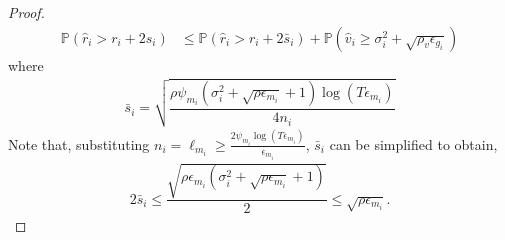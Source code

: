 \begin{proof}
\noindent
\begin{align}
\mathbb{P}(\hat{r}_{i}> r_{i} + 2s_{i})
&\leq \mathbb{P}\left( \hat{r}_{i} > r_{i}+ 2\bar{s}_i\right)  %
+ \mathbb{P}\left( \hat{v}_{i}\geq \sigma_{i}^{2}+\sqrt{\rho_{v}\epsilon_{g_{i}}}\right)\label{eq:prob_eq2}
\end{align}
where 
\begin{align*}
\bar{s}_i=\sqrt{\dfrac{\rho\psi_{m_i} (\sigma_{i}^{2}+\sqrt{\rho\epsilon_{m_{i}}} + 1)\log( T\epsilon_{m_{i}})}{4n_{i}}}
\end{align*}
Note that, substituting $n_i=\ell_{m_i}\ge \frac{2\psi_{m_i}\log{(T\epsilon_{m_{i}})}}{\epsilon_{m_{i}}}$, $\bar{s}_i$ can be simplified to obtain,
\begin{align}
2\bar{s}_i
\leq \dfrac{\sqrt{\rho\epsilon_{m_{i}}(\sigma_{i}^{2}+\sqrt{\rho\epsilon_{m_{i}}} + 1)}}{2}\leq \sqrt{\rho \epsilon_{m_{i}}}.
\label{si_bar_equn}
\end{align}



\end{proof}
